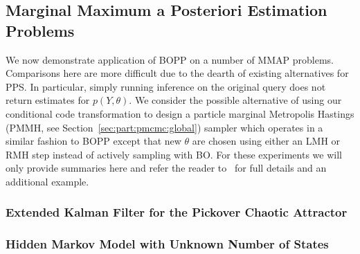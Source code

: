 \subsection{Marginal Maximum a Posteriori Estimation Problems}

We now demonstrate application of BOPP on a number of MMAP problems.  
Comparisons here are more difficult due to the dearth of existing alternatives for PPS.  
In particular, simply running inference on the original query does not return estimates 
for $p\left(Y,\theta\right)$.  We consider the possible alternative of using our 
conditional code transformation to design a particle marginal Metropolis Hastings 
(PMMH, see Section~\ref{sec:part:pmcmc:global}) sampler which operates in a similar fashion to 
BOPP except that new $\theta$ are chosen using either an LMH or RMH step instead 
of actively sampling with BO. For these experiments we will only provide summaries 
here and refer the reader to~\cite{rainforth2017boppArxiv} for full details and an 
additional example.
%
%
%

\subsubsection{Extended Kalman Filter for the Pickover Chaotic Attractor}
\label{sec:AppKalman}



\subsubsection{Hidden Markov Model with Unknown Number of States}


